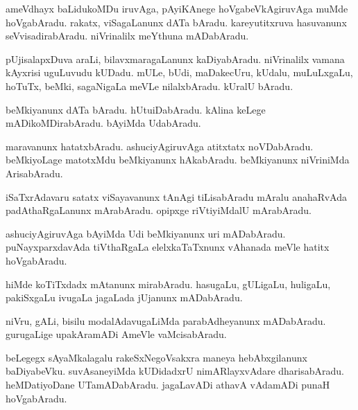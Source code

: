 \documentclass{article}
\begin{document}
\begin{mn}
ameVdhayx baLidukoMDu iruvAga, pAyiKAnege hoVgabeVkAgiruvAga muMde hoVgabAradu. rakatx, 
viSagaLanunx dATa bAradu. kareyutitxruva hasuvanunx seVvisadirabAradu. niVrinalilx meYthuna 
mADabAradu.
\end{mn}

\begin{mn}
pUjisalapxDuva araLi, bilavxmaragaLanunx kaDiyabAradu. niVrinalilx vamana kAyxrisi uguLuvudu 
kUDadu. mULe, bUdi, maDakecUru, kUdalu, muLuLxgaLu, hoTuTx, beMki, sagaNigaLa meVLe 
nilalxbAradu. kUralU bAradu.
\end{mn}

\begin{mn}
beMkiyanunx dATa bAradu. hUtuiDabAradu. kAlina keLege mADikoMDirabAradu. bAyiMda UdabAradu.
\end{mn}

\begin{mn}
maravanunx hatatxbAradu. ashuciyAgiruvAga atitxtatx noVDabAradu. beMkiyoLage matotxMdu 
beMkiyanunx hAkabAradu. beMkiyanunx niVriniMda ArisabAradu.
\end{mn}

\begin{mn}
iSaTxrAdavaru satatx viSayavanunx tAnAgi tiLisabAradu mAralu anahaRvAda padAthaRgaLanunx 
mArabAradu. opipxge riVtiyiMdalU mArabAradu.
\end{mn}

\begin{mn}
ashuciyAgiruvAga bAyiMda Udi beMkiyanunx uri mADabAradu. puNayxparxdavAda tiVthaRgaLa 
elelxkaTaTxnunx vAhanada meVle hatitx hoVgabAradu.
\end{mn}

\begin{mn}
hiMde koTiTxdadx mAtanunx mirabAradu. hasugaLu, gULigaLu, huligaLu, pakiSxgaLu ivugaLa jagaLada 
jUjanunx mADabAradu.
\end{mn}

\begin{mn}
niVru, gALi, bisilu modalAdavugaLiMda parabAdheyanunx mADabAradu. gurugaLige upakAramADi AmeVle 
vaMcisabAradu.
\end{mn}

\begin{mn}
beLegegx sAyaMkalagalu rakeSxNegoVsakxra maneya hebAbxgilanunx baDiyabeVku. 
suvAsaneyiMda kUDidadxrU nimARlayxvAdare dharisabAradu. heMDatiyoDane UTamADabAradu. jagaLavADi
athavA vAdamADi punaH hoVgabAradu.
\end{mn}
\end{document}
